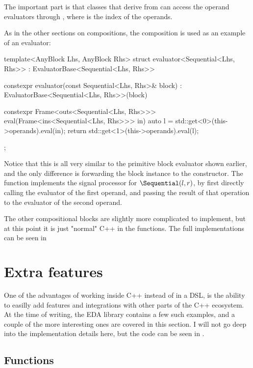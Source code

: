 The important part is that classes that derive from  can access the operand evaluators
through , where  is the index of the operands.

As in the other sections on compositions, the \Sequential composition is used as an example of an evaluator:

\begin{cppcodenl}
  template<AnyBlock Lhs, AnyBlock Rhs>
  struct evaluator<Sequential<Lhs, Rhs>> : EvaluatorBase<Sequential<Lhs, Rhs>> {
    constexpr evaluator(const Sequential<Lhs, Rhs>& block) : EvaluatorBase<Sequential<Lhs, Rhs>>(block) {}

    constexpr Frame<outs<Sequential<Lhs, Rhs>>> eval(Frame<ins<Sequential<Lhs, Rhs>>> in)
    {
      auto l = std::get<0>(this->operands).eval(in);
      return std::get<1>(this->operands).eval(l);
    }
  };
\end{cppcodenl}

Notice that this is all very similar to the primitive block evaluator shown earlier, and the only difference
is forwarding the block instance to the  constructor.  The  function implements the signal processor
for $\Sequential(l, r)$, by first directly calling the evaluator of the first operand, and passing the
result of that operation to the evaluator of the second operand.

The other compositional blocks are slightly more complicated to implement, but at this point it is just
"normal" C++ in the  functions. The full implementations can be seen in 

\section{Extra features}

One of the advantages of working inside C++ instead of in a DSL, is the ability to easilly add features and
integrations with other parts of the C++ ecosystem. At the time of writing, the EDA library contains a few
such examples, and a couple of the more interesting ones are covered in this section. I will not go deep into
the implementation details here, but the code can be seen in .

\subsection{Functions}

